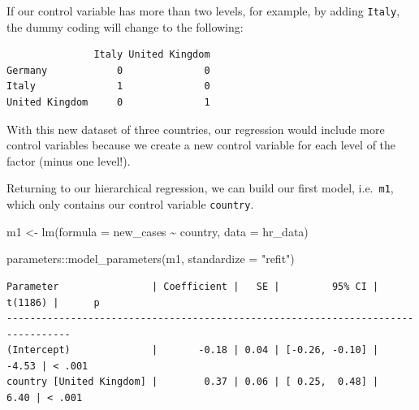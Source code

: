 \documentclass[
  letterpaper,
]{krantz}
\makeatletter
\newenvironment{Shaded}{\begin{snugshade}}{\end{snugshade}}
\newcommand{\AttributeTok}[1]{\textcolor[rgb]{0.40,0.45,0.13}{#1}}
\newcommand{\FunctionTok}[1]{\textcolor[rgb]{0.28,0.35,0.67}{#1}}
\newcommand{\NormalTok}[1]{\textcolor[rgb]{0.00,0.23,0.31}{#1}}
\newcommand{\OtherTok}[1]{\textcolor[rgb]{0.00,0.23,0.31}{#1}}
\newcommand{\SpecialCharTok}[1]{\textcolor[rgb]{0.37,0.37,0.37}{#1}}
\newcommand{\StringTok}[1]{\textcolor[rgb]{0.13,0.47,0.30}{#1}}
\newenvironment{kframe}{%
\medskip{}
\setlength{\fboxsep}{.8em}
 \def\at@end@of@kframe{}%
 \ifinner\ifhmode%
  \def\at@end@of@kframe{\end{minipage}}%
  \begin{minipage}{\columnwidth}%
 \fi\fi%
 \def\FrameCommand##1{\hskip\@totalleftmargin \hskip-\fboxsep
 \colorbox{shadecolor}{##1}\hskip-\fboxsep
     \hskip-\linewidth \hskip-\@totalleftmargin \hskip\columnwidth}%
 \MakeFramed {\advance\hsize-\width
   \@totalleftmargin\z@ \linewidth\hsize
   \@setminipage}}%
 {\par\unskip\endMakeFramed%
 \at@end@of@kframe}
\renewenvironment{Shaded}{\begin{kframe}}{\end{kframe}}
\makeatother
\begin{document}
If our control variable has more than two levels, for example, by adding
\texttt{Italy}, the dummy coding will change to the following:

\begin{Shaded}
\end{Shaded}

\begin{verbatim}
               Italy United Kingdom
Germany            0              0
Italy              1              0
United Kingdom     0              1
\end{verbatim}

With this new dataset of three countries, our regression would include
more control variables because we create a new control variable for each
level of the factor (minus one level!).

Returning to our hierarchical regression, we can build our first model,
i.e.~\texttt{m1}, which only contains our control variable
\texttt{country}.

\begin{Shaded}
\begin{Highlighting}[]
\NormalTok{m1 }\OtherTok{\textless{}{-}} \FunctionTok{lm}\NormalTok{(}\AttributeTok{formula =}\NormalTok{ new\_cases }\SpecialCharTok{\textasciitilde{}}\NormalTok{ country,}
         \AttributeTok{data =}\NormalTok{ hr\_data)}

\NormalTok{parameters}\SpecialCharTok{::}\FunctionTok{model\_parameters}\NormalTok{(m1, }\AttributeTok{standardize =} \StringTok{"refit"}\NormalTok{)}
\end{Highlighting}
\end{Shaded}

\begin{verbatim}
Parameter                | Coefficient |   SE |         95% CI | t(1186) |      p
---------------------------------------------------------------------------------
(Intercept)              |       -0.18 | 0.04 | [-0.26, -0.10] |   -4.53 | < .001
country [United Kingdom] |        0.37 | 0.06 | [ 0.25,  0.48] |    6.40 | < .001
\end{verbatim}
\end{document}
